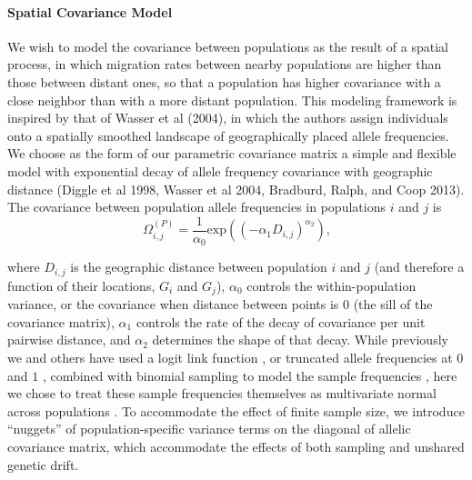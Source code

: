 \documentclass[12pt]{article}
\newcommand{\plrm}[1]{\todo[color=green!20]{#1}}
\newcommand{\plrm}[1]{\plr{#1}}
\newcommand{\plr}[1]{{\it\color{green}{(#1)}}}
\begin{document}
\paragraph{Spatial Covariance Model}
We wish to model the covariance between populations as the result of a spatial process, in which migration rates between nearby populations are higher than those between distant ones, so that a population has higher covariance with a close neighbor than with a more distant population.  This modeling framework is inspired by that of Wasser et al (2004), in which the authors assign individuals onto a spatially smoothed landscape of geographically placed allele frequencies.  We choose as the form of our parametric covariance matrix a simple and flexible model with exponential decay of allele frequency covariance with geographic distance (Diggle et al 1998, Wasser et al 2004, Bradburd, Ralph, and Coop 2013).  
The covariance between \plr{normalized}\plrm{explain} population allele frequencies in populations $i$ and $j$ is 
\begin{equation}
\label{eq:spatial_covariance}
\Omega^{(P)}_{i,j} = \frac{1}{\alpha_0} \text{exp} \left(	\left( -\alpha_1D_{i,j} \right)^{\alpha_2} \right) \text{,}
\end{equation}

where $D_{i,j}$ is the geographic distance between population $i$ and $j$ (and therefore a function of their locations, $G_i$ and $G_j$), $\alpha_0$ controls the within-population variance, or the covariance when distance between points is 0 (the sill of the covariance matrix),  $\alpha_1$ controls the rate of the decay of covariance per unit pairwise distance, and $\alpha_2$ determines the shape of that decay. While previously we and others have used a logit link function \citep{Wasser, Bradburd}, or truncated allele frequencies at $0$ and $1$ \citep{Nicholson,Coop2010}, combined with binomial sampling to model the sample frequencies \citep{Wasser, Bradburd}, here we chose to treat these sample frequencies themselves as multivariate normal across populations \citep[]{Treemix}. To accommodate the effect of finite sample size, we introduce ``nuggets'' of population-specific variance terms on the diagonal of allelic covariance matrix, \plrm{explain nuggets with less jargon?} which accommodate the effects of both sampling and unshared genetic drift.
\end{document}

